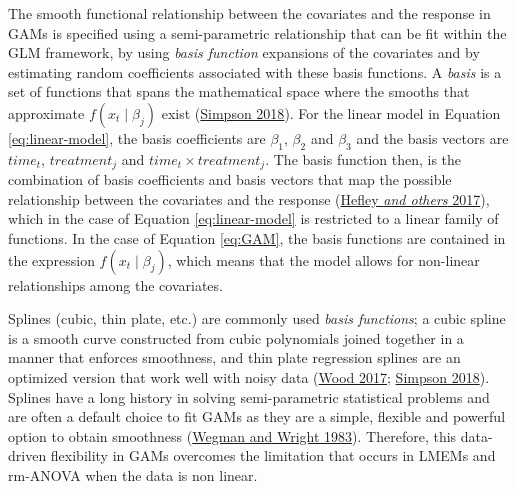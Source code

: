 \documentclass[
]{article}
\begin{document}
The smooth functional relationship between the covariates and the response in GAMs is specified using a semi-parametric relationship that can be fit within the GLM framework, by using \emph{basis function} expansions of the covariates and by estimating random coefficients associated with these basis functions. A \emph{basis} is a set of functions that spans the mathematical space where the smooths that approximate \(f(x_t\mid \beta_j)\) exist (\protect\hyperlink{ref-simpson2018}{Simpson 2018}). For the linear model in Equation \eqref{eq:linear-model}, the basis coefficients are \(\beta_1\), \(\beta_2\) and \(\beta_3\) and the basis vectors are \(time_t\), \(treatment_j\) and \(time_t \times treatment_j\). The basis function then, is the combination of basis coefficients and basis vectors that map the possible relationship between the covariates and the response (\protect\hyperlink{ref-hefley2017}{Hefley \emph{and others} 2017}), which in the case of Equation \eqref{eq:linear-model} is restricted to a linear family of functions. In the case of Equation \eqref{eq:GAM}, the basis functions are contained in the expression \(f(x_t\mid \beta_j)\), which means that the model allows for non-linear relationships among the covariates.

Splines (cubic, thin plate, etc.) are commonly used \emph{basis functions}; a cubic spline is a smooth curve constructed from cubic polynomials joined together in a manner that enforces smoothness, and thin plate regression splines are an optimized version that work well with noisy data (\protect\hyperlink{ref-wood2017}{Wood 2017}; \protect\hyperlink{ref-simpson2018}{Simpson 2018}). Splines have a long history in solving semi-parametric statistical problems and are often a default choice to fit GAMs as they are a simple, flexible and powerful option to obtain smoothness (\protect\hyperlink{ref-wegman1983}{Wegman and Wright 1983}). Therefore, this data-driven flexibility in GAMs overcomes the limitation that occurs in LMEMs and rm-ANOVA when the data is non linear.
\end{document}
